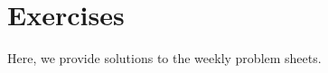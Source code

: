 \chapter*{Exercises}
\thispagestyle{empty}

Here, we provide solutions to the weekly problem sheets.

